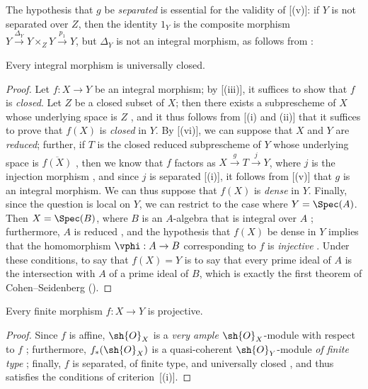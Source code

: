 \begin{remark}[6.1.9]
\label{II.6.1.9}
The hypothesis that $g$ be \emph{separated} is essential for the validity of [(v)]: if $Y$ is not separated over $Z$, then the identity $1_Y$ is the composite morphism $Y\xrightarrow{\Delta_Y}Y\times_Z Y\xrightarrow{p_1}Y$, but $\Delta_Y$ is not an integral morphism, as follows from :
\end{remark}

\begin{proposition}[6.1.10]
\label{II.6.1.10}
Every integral morphism is universally closed.
\end{proposition}

\begin{proof}
Let $f:X\to Y$ be an integral morphism;
by [(iii)], it suffices to show that $f$ is \emph{closed}.
Let $Z$ be a closed subset of $X$;
then there exists a subprescheme of $X$ whose underlying space is $Z$ , and it thus follows from [(i) and (ii)] that it suffices to prove that $f(X)$ is \emph{closed} in $Y$.
By [(vi)], we can suppose that $X$ and $Y$ are \emph{reduced};
further, if $T$ is the closed reduced subprescheme of $Y$ whose underlying space is $\overline{f(X)}$ , then we know that $f$ factors as $X\xrightarrow{g}T\xrightarrow{j}Y$, where $j$ is the injection morphism , and since $j$ is separated [(i)], it follows from [(v)] that $g$ is an integral morphism.
We can thus suppose that $f(X)$ is \emph{dense} in $Y$.
Finally, since the question is local on $Y$, we can restrict to the case where $Y=\Spec(A)$.
Then $X=\Spec(B)$, where $B$ is an $A$-algebra that is integral over $A$ ;
furthermore, $A$ is reduced , and the hypothesis that $f(X)$ be dense in $Y$ implies that the homomorphism $\vphi:A\to B$ corresponding to $f$ is \emph{injective} .
Under these conditions, to say that $f(X)=Y$ is to say that every prime ideal of $A$ is the intersection with $A$ of a prime ideal of $B$, which is exactly the first theorem of Cohen--Seidenberg (\cite[t.~I, p.~257, th.~3]{I-13}).
\end{proof}

\begin{corollary}[6.1.11]
\label{II.6.1.11}
Every finite morphism $f:X\to Y$ is projective.
\end{corollary}

\begin{proof}
Since $f$ is affine, $\sh{O}_X$ is a \emph{very ample} $\sh{O}_X$-module with respect to $f$ ;
furthermore, $f_*(\sh{O}_X)$ is a quasi-coherent $\sh{O}_Y$-module \emph{of finite type} ;
finally, $f$ is separated, of finite type, and universally closed , and thus satisfies the conditions of criterion~[(i)].
\end{proof}

